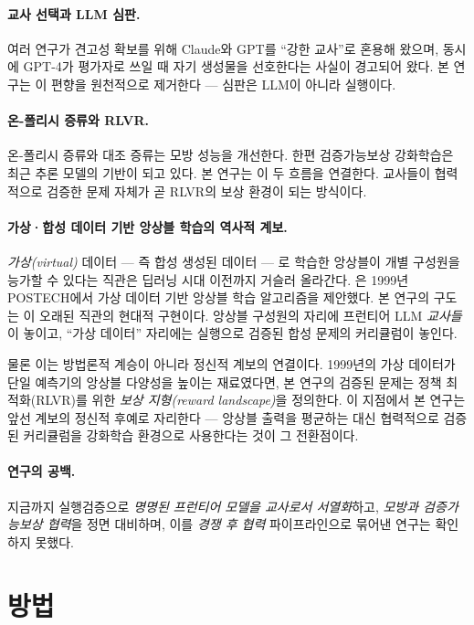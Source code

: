 \documentclass[11pt]{article}
\begin{document}
\paragraph{교사 선택과 LLM 심판.}
여러 연구가 견고성 확보를 위해 Claude와 GPT를 ``강한 교사''로 혼용해 왔으며, 동시에 GPT-4가 평가자로 쓰일 때 자기 생성물을 선호한다는 사실이 경고되어 왔다\citep{rlhfbook}. 본 연구는 이 편향을 원천적으로 제거한다 --- 심판은 LLM이 아니라 실행이다.

\paragraph{온-폴리시 증류와 RLVR.}
온-폴리시 증류\citep{minillm}와 대조 증류\citep{distillm2}는 모방 성능을 개선한다. 한편 검증가능보상 강화학습은 최근 추론 모델의 기반이 되고 있다. 본 연구는 이 두 흐름을 연결한다. 교사들이 협력적으로 검증한 문제 자체가 곧 RLVR의 보상 환경이 되는 방식이다.

\paragraph{가상·합성 데이터 기반 앙상블 학습의 역사적 계보.}
\emph{가상(virtual)} 데이터 --- 즉 합성 생성된 데이터 --- 로 학습한 앙상블이 개별 구성원을 능가할 수 있다는 직관은 딥러닝 시대 이전까지 거슬러 올라간다. \citet{jang1999ola}은 1999년 POSTECH에서 가상 데이터 기반 앙상블 학습 알고리즘을 제안했다. 본 연구의 구도는 이 오래된 직관의 현대적 구현이다. 앙상블 구성원의 자리에 프런티어 LLM \emph{교사들}이 놓이고, ``가상 데이터'' 자리에는 실행으로 검증된 합성 문제의 커리큘럼이 놓인다.

물론 이는 방법론적 계승이 아니라 정신적 계보의 연결이다. 1999년의 가상 데이터가 단일 예측기의 앙상블 다양성을 높이는 재료였다면, 본 연구의 검증된 문제는 정책 최적화(RLVR)를 위한 \emph{보상 지형(reward landscape)}을 정의한다. 이 지점에서 본 연구는 앞선 계보의 정신적 후예로 자리한다 --- 앙상블 출력을 평균하는 대신 협력적으로 검증된 커리큘럼을 강화학습 환경으로 사용한다는 것이 그 전환점이다.

\paragraph{연구의 공백.}
지금까지 실행검증으로 \emph{명명된 프런티어 모델을 교사로서 서열화}하고, \emph{모방과 검증가능보상 협력}을 정면 대비하며, 이를 \emph{경쟁 후 협력} 파이프라인으로 묶어낸 연구는 확인하지 못했다.

\section{방법}
\end{document}
